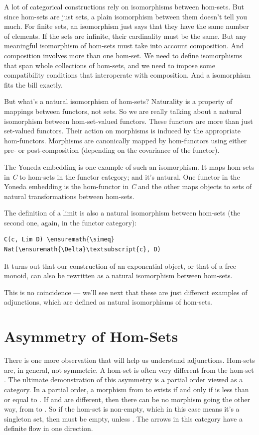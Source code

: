 A lot of categorical constructions rely on isomorphisms between
hom-sets. But since hom-sets are just sets, a plain isomorphism between
them doesn't tell you much. For finite sets, an isomorphism just says
that they have the same number of elements. If the sets are infinite,
their cardinality must be the same. But any meaningful isomorphism of
hom-sets must take into account composition. And composition involves
more than one hom-set. We need to define isomorphisms that span whole
collections of hom-sets, and we need to impose some compatibility
conditions that interoperate with composition. And a 
isomorphism fits the bill exactly.

But what's a natural isomorphism of hom-sets? Naturality is a property
of mappings between functors, not sets. So we are really talking about a
natural isomorphism between hom-set-valued functors. These functors are
more than just set-valued functors. Their action on morphisms is induced
by the appropriate hom-functors. Morphisms are canonically mapped by
hom-functors using either pre- or post-composition (depending on the
covariance of the functor).

The Yoneda embedding is one example of such an isomorphism. It maps
hom-sets in \emph{C} to hom-sets in the functor category; and it's
natural. One functor in the Yoneda embedding is the hom-functor in
\emph{C} and the other maps objects to sets of natural transformations
between hom-sets.

The definition of a limit is also a natural isomorphism between hom-sets
(the second one, again, in the functor category):

\begin{Verbatim}[commandchars=\\\{\}]
C(c, Lim D) \ensuremath{\simeq} Nat(\ensuremath{\Delta}\textsubscript{c}, D)
\end{Verbatim}
It turns out that our construction of an exponential object, or that of
a free monoid, can also be rewritten as a natural isomorphism between
hom-sets.

This is no coincidence --- we'll see next that these are just different
examples of adjunctions, which are defined as natural isomorphisms of
hom-sets.

\section{Asymmetry of Hom-Sets}\label{asymmetry-of-hom-sets}

There is one more observation that will help us understand adjunctions.
Hom-sets are, in general, not symmetric. A hom-set  is
often very different from the hom-set . The ultimate
demonstration of this asymmetry is a partial order viewed as a category.
In a partial order, a morphism from  to  exists if
and only if  is less than or equal to . If
 and  are different, then there can be no morphism
going the other way, from  to . So if the hom-set
 is non-empty, which in this case means it's a
singleton set, then  must be empty, unless
. The arrows in this category have a definite flow in
one direction.

